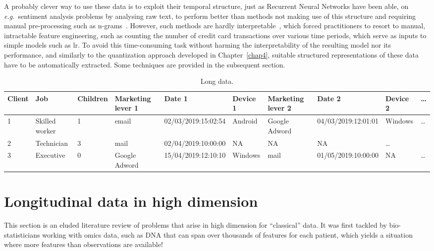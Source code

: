 A probably clever way to use these data is to exploit their temporal structure, just as Recurrent Neural Networks have been able, on \textit{e.g.}\ sentiment analysis problems by analysing raw text, to perform better than methods not making use of this structure and requiring manual pre-processing such as n-grams~\cite{manning1999foundations}. However, such methods are hardly interpretable~\cite{lou2012intelligible}, which forced practitioners to resort to manual, intractable feature engineering, such as counting the number of credit card transactions over various time periods, which serve as inputs to simple models such as \gls{lr}. To avoid this time-consuming task without harming the interpretability of the resulting model nor its performance, and similarly to the quantization approach developed in Chapter~\ref{chap4}, suitable structured representations of these data have to be automatically extracted. Some techniques are provided in the subsequent section.

\begin{table}[ht]
    \centering
    \caption{Long data.}
    \label{tab:example_longitudinal}
    \begin{tiny}
\begin{tabular}{llllllllll}
Client & Job & Children & Marketing lever 1 & Date 1 & Device 1 & Marketing lever 2 & Date 2 & Device 2 & \dots \\
 \hline
1 & Skilled worker & 1 & email & 02/03/2019:15:02:54 & Android & Google Adword & 04/03/2019:12:01:01 & Windows & \dots \\
2 & Technician & 3 & mail & 02/04/2019:10:00:00 & NA & NA & NA & \dots\\
3 & Executive & 0 & Google Adword & 15/04/2019:12:10:10 & Windows & mail & 01/05/2019:10:00:00 & NA & \dots \\
\end{tabular}
    \end{tiny}
\end{table}


\section{Longitudinal data in high dimension}

This section is an eluded literature review of problems that arise in high dimension for ``classical'' data. It was first tackled by bio-statisticians working with omics data, such as DNA that can span over thousands of features for each patient, which yields a situation where more features than observations are available!

